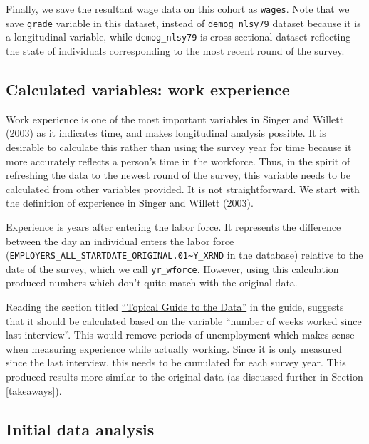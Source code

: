 \documentclass{article}
\begin{document}
Finally, we save the resultant wage data on this cohort as \texttt{wages}. Note that we save \texttt{grade} variable in this dataset, instead of \texttt{demog\_nlsy79} dataset because it is a longitudinal variable, while \texttt{demog\_nlsy79} is cross-sectional dataset reflecting the state of individuals corresponding to the most recent round of the survey.

\hypertarget{calculated-variables-work-experience}{%
\subsection{Calculated variables: work experience}\label{calculated-variables-work-experience}}

Work experience is one of the most important variables in Singer and Willett (2003) as it indicates time, and makes longitudinal analysis possible. It is desirable to calculate this rather than using the survey year for time because it more accurately reflects a person's time in the workforce. Thus, in the spirit of refreshing the data to the newest round of the survey, this variable needs to be calculated from other variables provided. It is not straightforward. We start with the definition of experience in Singer and Willett (2003).

Experience is years after entering the labor force. It represents the difference between the day an individual enters the labor force (\texttt{EMPLOYERS\_ALL\_STARTDATE\_ORIGINAL.01\textasciitilde{}Y\_XRND} in the database) relative to the date of the survey, which we call \texttt{yr\_wforce}. However, using this calculation produced numbers which don't quite match with the original data.

Reading the section titled \href{https://www.nlsinfo.org/content/cohorts/nlsy79/topical-guide/employment/work-experience}{``Topical Guide to the Data''} in the guide, suggests that it should be calculated based on the variable ``number of weeks worked since last interview''. This would remove periods of unemployment which makes sense when measuring experience while actually working. Since it is only measured since the last interview, this needs to be cumulated for each survey year. This produced results more similar to the original data (as discussed further in Section \ref{takeaways}).

\hypertarget{ida}{%
\subsection{Initial data analysis}\label{ida}}
\end{document}
